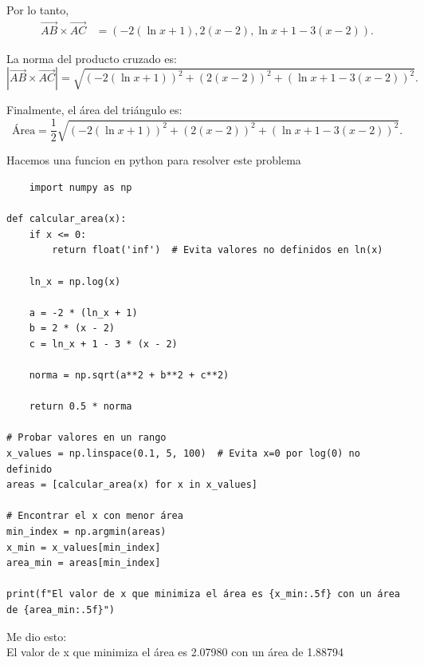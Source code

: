 \documentclass[11pt,letterpaper]{article}
\begin{document}
Por lo tanto,
\begin{align*}
\overrightarrow{AB} \times \overrightarrow{AC} &= (-2(\ln x + 1),
2(x - 2),
\ln x + 1 - 3(x - 2)).
\end{align*}

La norma del producto cruzado es:
\begin{equation*}
\left| \overrightarrow{AB} \times \overrightarrow{AC} \right| = \sqrt{
(-2(\ln x + 1))^2 + (2(x - 2))^2 + (\ln x + 1 - 3(x - 2))^2}.
\end{equation*}

Finalmente, el área del triángulo es:
\begin{equation*}
\text{Área} = \frac{1}{2} \sqrt{
(-2(\ln x + 1))^2 + (2(x - 2))^2 + (\ln x + 1 - 3(x - 2))^2}.
\end{equation*}


Hacemos una funcion en python para resolver este problema
\begin{verbatim}
    import numpy as np

def calcular_area(x):
    if x <= 0:
        return float('inf')  # Evita valores no definidos en ln(x)
    
    ln_x = np.log(x)
    
    a = -2 * (ln_x + 1)
    b = 2 * (x - 2)
    c = ln_x + 1 - 3 * (x - 2)
    
    norma = np.sqrt(a**2 + b**2 + c**2)
    
    return 0.5 * norma

# Probar valores en un rango
x_values = np.linspace(0.1, 5, 100)  # Evita x=0 por log(0) no definido
areas = [calcular_area(x) for x in x_values]

# Encontrar el x con menor área
min_index = np.argmin(areas)
x_min = x_values[min_index]
area_min = areas[min_index]

print(f"El valor de x que minimiza el área es {x_min:.5f} con un área de {area_min:.5f}")

\end{verbatim}
Me dio esto:\\
El valor de x que minimiza el área es 2.07980 con un área de 1.88794
\end{document}
